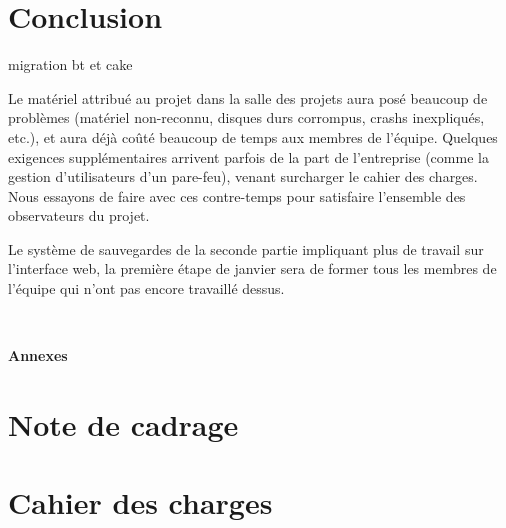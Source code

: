 \section{Conclusion}

migration bt et cake



Le matériel attribué au projet dans la salle des projets aura posé beaucoup de problèmes (matériel non-reconnu, disques durs corrompus, crashs inexpliqués, etc.), et aura déjà coûté beaucoup de temps aux membres de l'équipe. Quelques exigences supplémentaires arrivent parfois de la part de l'entreprise (comme la gestion d'utilisateurs d'un pare-feu), venant surcharger le cahier des charges. Nous essayons de faire avec ces contre-temps pour satisfaire l'ensemble des observateurs du projet.

Le système de sauvegardes de la seconde partie impliquant plus de travail sur l'interface web, la première étape de janvier sera de former tous les membres de l'équipe qui n'ont pas encore travaillé dessus.

\newpage
~\vspace{5cm}
\begin{center}
	{\Huge \textbf{Annexes}}
\end{center}
\newpage

\appendix

\section{Note de cadrage}
\label{note-cadrage}


\section{Cahier des charges}
\label{cahier-charges}


